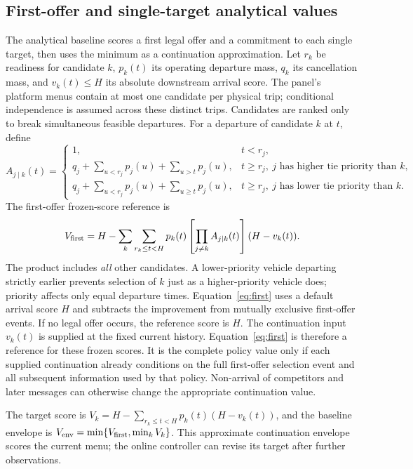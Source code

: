 \documentclass[preprint,12pt,authoryear]{elsarticle}
\begin{document}
\subsection{First-offer and single-target analytical values}
The analytical baseline scores a first legal offer and a commitment to each
single target, then uses the minimum as a continuation approximation. Let $r_k$
be readiness for candidate $k$, $p_k(t)$ its operating departure mass, $q_k$ its
cancellation mass, and $v_k(t)\le H$ its absolute downstream arrival score.
The panel's platform menus contain at most one candidate per physical trip;
conditional independence is assumed across these distinct trips. Candidates
are ranked only to break simultaneous feasible departures. For a departure of
candidate $k$ at $t$, define
\begin{equation}
 A_{j\mid k}(t)=
 \begin{cases}
  1, &t<r_j,\\
  q_j+\sum_{u<r_j}p_j(u)+\sum_{u>t}p_j(u),
       &t\ge r_j,\ j\text{ has higher tie priority than }k,\\
  q_j+\sum_{u<r_j}p_j(u)+\sum_{u\ge t}p_j(u),
       &t\ge r_j,\ j\text{ has lower tie priority than }k.
 \end{cases}
\label{eq:competitor}
\end{equation}
The first-offer frozen-score reference is
\begin{equation}
 V_{\rm first}=H-
 \sum_k\sum_{r_k\le t<H}
 p_k(t)\left[\prod_{j\ne k}A_{j\mid k}(t)\right](H-v_k(t)).
\label{eq:first}
\end{equation}
The product includes \emph{all} other candidates. A lower-priority vehicle
departing strictly earlier prevents selection of $k$ just as a higher-priority
vehicle does; priority affects only equal departure times. Equation~\ref{eq:first}
uses a default arrival score $H$ and subtracts the improvement from mutually
exclusive first-offer events. If no legal offer occurs, the reference score is
$H$.
The continuation input $v_k(t)$ is supplied at the fixed current history.
Equation~\ref{eq:first} is therefore a reference for these frozen scores. It is
the complete policy value only if each supplied continuation already conditions
on the full first-offer selection event and all subsequent information used by
that policy. Non-arrival of competitors and later messages can otherwise change
the appropriate continuation value.

The target score is
$V_k=H-\sum_{r_k\le t<H}p_k(t)(H-v_k(t))$, and the baseline envelope is
$V_{\rm env}=\min\{V_{\rm first},\min_k V_k\}$.
This approximate continuation envelope scores the current menu; the online
controller can revise its target after further observations.
\end{document}
